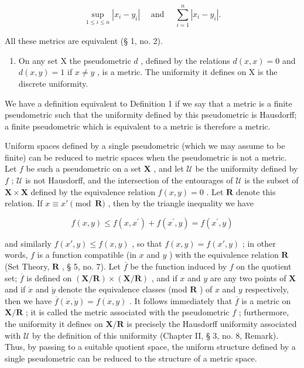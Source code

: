 \[
\sup _ {1 \leqslant i \leqslant n} | x _ {i} - y _ {i} | \quad \text { and } \quad \sum_ {i = 1} ^ {n} | x _ {i} - y _ {i} |.
\]

All these metrics are equivalent (§ 1, no. 2).

\begin{enumerate}
\def\labelenumi{\arabic{enumi})}
\setcounter{enumi}{1}
\tightlist
\item
  On any set X the pseudometric \(d\) , defined by the relations \(d(x, x) = 0\) and \(d(x, y) = 1\) if \(x \neq y\) , is a metric. The uniformity it defines on X is the discrete uniformity.
\end{enumerate}

We have a definition equivalent to Definition 1 if we say that a metric is a finite pseudometric such that the uniformity defined by this pseudometric is Hausdorff; a finite pseudometric which is equivalent to a metric is therefore a metric.

Uniform spaces defined by a single pseudometric (which we may assume to be finite) can be reduced to metric spaces when the pseudometric is not a metric. Let \(f\) be such a pseudometric on a set \(\mathbf{X}\) , and let \(\mathcal{U}\) be the uniformity defined by \(f\) ; \(\mathcal{U}\) is not Hausdorff, and the intersection of the entourages of \(\mathcal{U}\) is the subset of \(\mathbf{X} \times \mathbf{X}\) defined by the equivalence relation \(f(x,y) = 0\) . Let \(\mathbf{R}\) denote this relation. If \(x \equiv x' \pmod{\mathbf{R}}\) , then by the triangle inequality we have

\[
f (x, y) \leqslant f (x, x ^ {\prime}) + f (x ^ {\prime}, y) = f (x ^ {\prime}, y)
\]

and similarly \(f(x', y) \leqslant f(x, y)\) , so that \(f(x, y) = f(x', y)\) ; in other words, \(f\) is a function compatible (in \(x\) and \(y\) ) with the equivalence relation \(\mathbf{R}\) (Set Theory, \(\mathbf{R}\) , § 5, no. 7). Let \(\overline{f}\) be the function induced by \(f\) on the quotient set; \(\overline{f}\) is defined on \((\mathbf{X}/\mathbf{R}) \times (\mathbf{X}/\mathbf{R})\) , and if \(x\) and \(y\) are any two points of \(\mathbf{X}\) and if \(\dot{x}\) and \(\dot{y}\) denote the equivalence classes (mod \(\mathbf{R}\) ) of \(x\) and \(y\) respectively, then we have \(\overline{f}(\dot{x}, \dot{y}) = f(x, y)\) . It follows immediately that \(\overline{f}\) is a metric on \(\mathbf{X}/\mathbf{R}\) ; it is called the metric associated with the pseudometric \(f\) ; furthermore, the uniformity it defines on \(\mathbf{X}/\mathbf{R}\) is precisely the Hausdorff uniformity associated with \(\mathcal{U}\) by the definition of this uniformity (Chapter II, § 3, no. 8, Remark). Thus, by passing to a suitable quotient space, the uniform structure defined by a single pseudometric can be reduced to the structure of a metric space.

